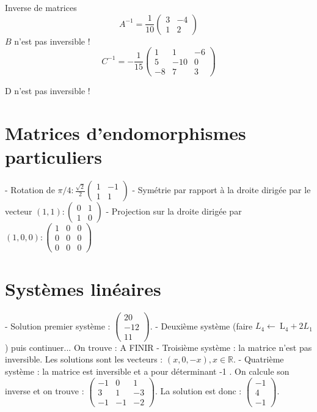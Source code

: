 Inverse de matrices
\[
A^{-1}=\frac{1}{10}\left(\begin{array}{cc}
3 & -4 \\
1 & 2
\end{array}\right)
\]
\(B\) n'est pas inversible !
\[
C^{-1}=-\frac{1}{15}\left(\begin{array}{ccc}
1 & 1 & -6 \\
5 & -10 & 0 \\
-8 & 7 & 3
\end{array}\right)
\]

D n'est pas inversible !

\section*{Matrices d'endomorphismes particuliers}
- Rotation de \(\pi / 4: \frac{\sqrt{2}}{2}\left(\begin{array}{cc}1 & -1 \\ 1 & 1\end{array}\right)\)
- Symétrie par rapport à la droite dirigée par le vecteur \((1,1):\left(\begin{array}{ll}0 & 1 \\ 1 & 0\end{array}\right)\)
- Projection sur la droite dirigée par \((1,0,0):\left(\begin{array}{lll}1 & 0 & 0 \\ 0 & 0 & 0 \\ 0 & 0 & 0\end{array}\right)\)

\section*{Systèmes linéaires}
- Solution premier système : \(\left(\begin{array}{c}20 \\ -12 \\ 11\end{array}\right)\).
- Deuxième système (faire \(L_{4} \leftarrow \mathrm{~L}_{4}+2 L_{1}\) ) puis continuer... On trouve : A FINIR
- Troisième système : la matrice n'est pas inversible. Les solutions sont les vecteurs : \((x, 0,-x), x \in \mathbb{R}\).
- Quatrième système : la matrice est inversible et a pour déterminant -1 . On calcule son inverse et on trouve : \(\left(\begin{array}{ccc}-1 & 0 & 1 \\ 3 & 1 & -3 \\ -1 & -1 & -2\end{array}\right)\).
La solution est donc : \(\left(\begin{array}{c}-1 \\ 4 \\ -1\end{array}\right)\).